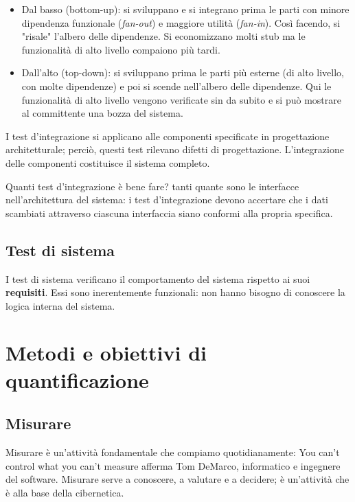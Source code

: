 \documentclass[a4paper]{article}
\begin{document}
	\begin{itemize}
		
			
	\item Dal basso (bottom-up): si sviluppano e si integrano prima le parti con minore dipendenza funzionale (\emph{fan-out}) e maggiore utilità (\emph{fan-in}). Così facendo, si "risale" l'albero delle dipendenze. Si economizzano molti stub ma le funzionalità di alto livello compaiono più tardi.
			
	\item Dall'alto (top-down): si sviluppano prima le parti più esterne (di alto livello, con molte dipendenze) e poi si scende nell'albero delle dipendenze. Qui le funzionalità di alto livello vengono verificate sin da subito e si può mostrare al committente una bozza del sistema.
		
	\end{itemize}

		
I test d'integrazione si applicano alle componenti specificate in progettazione architetturale; perciò, questi test rilevano difetti di progettazione. L'integrazione delle componenti costituisce il sistema completo.
		
Quanti test d'integrazione è bene fare? tanti quante sono le interfacce nell'architettura del sistema: i test d'integrazione devono accertare che i dati scambiati attraverso ciascuna interfaccia siano conformi alla propria specifica.

		
	\subsection{Test di sistema}

		
I test di sistema verificano il comportamento del sistema rispetto ai suoi \textbf{requisiti}. Essi sono inerentemente funzionali: non hanno bisogno di conoscere la logica interna del sistema.
	


		
	\section{Metodi e obiettivi di quantificazione}


		
	\subsection{Misurare}

		
Misurare è un'attività fondamentale che compiamo quotidianamente: You can't control what you can't measure afferma Tom DeMarco, informatico e ingegnere del software. Misurare serve a conoscere, a valutare e a decidere; è un'attività che è alla base della cibernetica.
		
\end{document}
